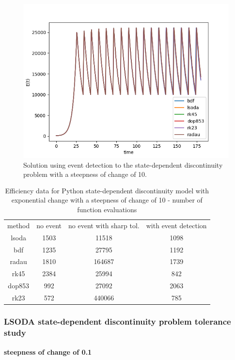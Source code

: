 \begin{figure}[H]
\centering
\includegraphics[width=0.7\linewidth]{./figures/exp_state_event_10}
\caption{Solution using event detection to the state-dependent discontinuity problem with a steepness of change of 10.}
\label{fig:exp_state_event_10}
\end{figure}

\begin{table}[h]
\caption {Efficiency data for Python state-dependent discontinuity model with exponential change with a steepness of change of 10 - number of function evaluations} \label{tab:exp_state_10}
\begin{center}
\begin{tabular}{ c c c c } 
method & no event & no event with sharp tol. & with event detection \\ 
lsoda & 1503   & 11518    & 1098 \\
bdf & 1235     & 27795    & 1192 \\
radau & 1810   & 164687   & 1739 \\
rk45 & 2384    & 25994    & 842 \\
dop853 & 992   & 27092    & 2063 \\
rk23 & 572     & 440066   & 785 \\

\end{tabular}
\end{center}
\end{table}

\subsubsection{LSODA state-dependent discontinuity problem tolerance study}
\paragraph{steepness of change of 0.1}

